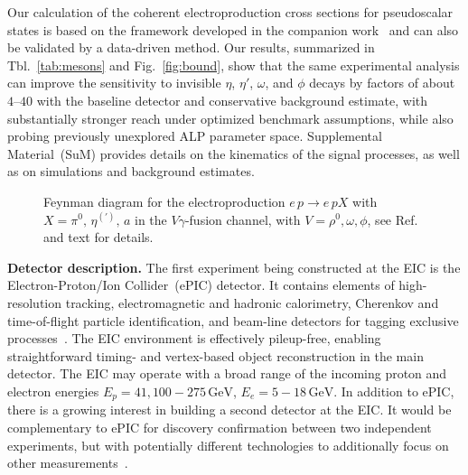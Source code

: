 \documentclass[aps,prd,preprintnumbers,superscriptaddress,nofootinbib,floatfix,twocolumn,notitlepage,reprint]{revtex4-2}
\newcommand{\GeV}{\mathrm{GeV}}
\begin{document}
Our calculation of the coherent electroproduction cross sections for pseudoscalar states is based on the framework developed in the companion work~\cite{Balkin:2026whv} and can also be validated by a data-driven method. Our results, summarized in Tbl.~\ref{tab:mesons} and Fig.~\ref{fig:bound}, show that the same experimental analysis can improve the sensitivity to invisible $\eta$, $\eta'$, $\omega$, and $\phi$ decays by factors of about $4$--$40$ with the baseline detector and conservative background estimate, with substantially stronger reach under optimized benchmark assumptions, while also probing previously unexplored ALP parameter space. Supplemental Material~(SuM) provides details on the kinematics of the signal processes, as well as on simulations and background estimates.
\begin{figure}[t!]
\centering
\begin{minipage}[t]{0.98\columnwidth}
\centering
{}
\end{minipage}
    \caption{
Feynman diagram for the electroproduction $e\,p \to e\,p X$ with $X=\pi^0,\,\eta^{(\prime)},\,a$ in the $V\gamma$-fusion channel, with $V=\rho^{0},\omega,\phi$, see Ref.~\cite{Balkin:2026whv} and text for details.}
    \label{fig:diagram}
\end{figure}

\textbf{Detector description.} 
The first experiment being constructed at the EIC is the Electron-Proton/Ion Collider~(ePIC) detector.
It contains elements of high-resolution tracking, electromagnetic and hadronic calorimetry, Cherenkov and time-of-flight particle identification, and beam-line detectors for tagging exclusive processes~\cite{ePICDetector}.
The EIC environment is effectively pileup-free, enabling straightforward timing- and vertex-based object reconstruction in the main detector.
The EIC may operate with a broad range of the incoming proton and electron energies $E_{p} = 41, 100-275\,\GeV$, $E_{e} = 5-18\,\GeV$. 
In addition to ePIC, there is a growing interest in building a second detector at the EIC.
It would be complementary to ePIC for discovery confirmation between two independent experiments, but with potentially different technologies to additionally focus on other measurements~\cite{BURKERT2023104032, NADEL-TURONSKI:2024/c}.
\end{document}

